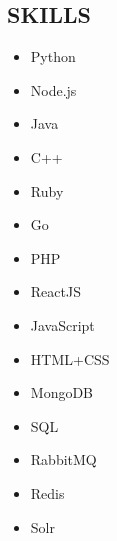 \documentclass[]{res}
\begin{document}
\address{
3B Software Engineering, University of Waterloo \\
(905) 758-2239 \textbar ~paul.ashbourne@uwaterloo.ca \\
\url{www.github.com/paulashbourne} %
}
\address{110 Orchard Heights Blvd.\\ \hfill Aurora, ON, Canada\\ \hfill L4G 2Z9}
\begin{resume}
 
\section{SKILLS}
\setlength\multicolsep{0pt}
\begin{multicols}{5}
  \begin{itemize}
    \item Python
    \item Node.js
    \item Java
    \item C++
    \item Ruby
    \item Go
    \item PHP
    \item ReactJS
    \item JavaScript
    \item HTML+CSS
    \item MongoDB
    \item SQL
    \item RabbitMQ
    \item Redis
    \item Solr
  \end{itemize}
\end{multicols}


\end{resume}
\end{document}
